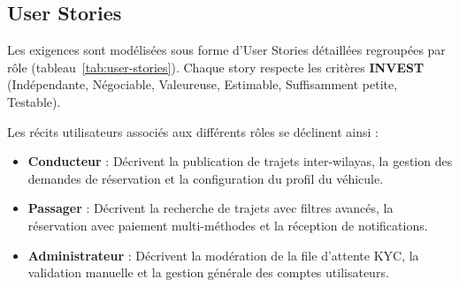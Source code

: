 \subsection{User Stories}
\label{sec:user-stories}

Les exigences sont modélisées sous forme d'User Stories détaillées regroupées par rôle (tableau~\ref{tab:user-stories}). Chaque story respecte les critères \textbf{INVEST} (Indépendante, Négociable, Valeureuse, Estimable, Suffisamment petite, Testable).

Les récits utilisateurs associés aux différents rôles se déclinent ainsi :
\begin{itemize}
  \item \textbf{Conducteur} : Décrivent la publication de trajets inter-wilayas, la gestion des demandes de réservation et la configuration du profil du véhicule.
  \item \textbf{Passager} : Décrivent la recherche de trajets avec filtres avancés, la réservation avec paiement multi-méthodes et la réception de notifications.
  \item \textbf{Administrateur} : Décrivent la modération de la file d'attente KYC, la validation manuelle et la gestion générale des comptes utilisateurs.
\end{itemize}

